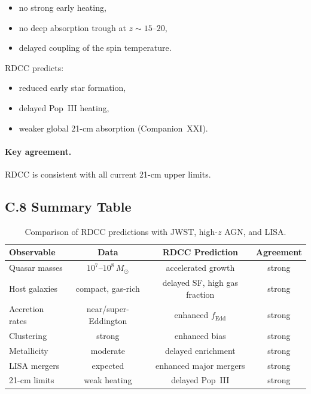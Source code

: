\documentclass[11pt,a4paper]{article}
\begin{document}
\begin{itemize}
    \item no strong early heating,
    \item no deep absorption trough at $z \sim 15$–$20$,
    \item delayed coupling of the spin temperature.
\end{itemize}

RDCC predicts:

\begin{itemize}
    \item reduced early star formation,
    \item delayed Pop~III heating,
    \item weaker global 21-cm absorption (Companion~XXI).
\end{itemize}

\paragraph{Key agreement.}
RDCC is consistent with all current 21-cm upper limits.

\subsection*{C.8 Summary Table}

\begin{table}[H]
\centering
\begin{tabular}{lccc}
\hline
\textbf{Observable} & \textbf{Data} & \textbf{RDCC Prediction} & \textbf{Agreement} \\
\hline
Quasar masses & $10^{7}$–$10^{8}\,M_{\odot}$ & accelerated growth & strong \\
Host galaxies & compact, gas-rich & delayed SF, high gas fraction & strong \\
Accretion rates & near/super-Eddington & enhanced $f_{\mathrm{Edd}}$ & strong \\
Clustering & strong & enhanced bias & strong \\
Metallicity & moderate & delayed enrichment & strong \\
LISA mergers & expected & enhanced major mergers & strong \\
21-cm limits & weak heating & delayed Pop~III & strong \\
\hline
\end{tabular}
\caption{Comparison of RDCC predictions with JWST, high-$z$ AGN, and LISA.}
\label{tab:comparisonCXXIII}
\end{table}
\end{document}
